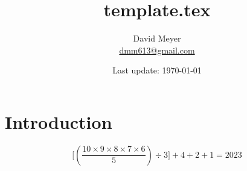 \documentclass{article}
\title{template.tex}
\author{David Meyer \\ \href{mailto:dmm613@gmail.com}
                            {dmm613@gmail.com}}
\date{Last update: \today}
\theoremstyle{definition}
\begin{document}
\maketitle
%
%
%
\section{Introduction}
\label{sec:introduction}



\bigskip
{\large
\begin{center}
\begin{equation*}
\Bigg [ \left (\dfrac{10 \times 9 \times 8 \times 7 \times 6}{5} \right ) \div 3 \Bigg ] + 4 + 2 + 1 = 2023
\end{equation*}
\end{center}}

\bigskip
%
%
%
%
%
%
%
%
%
%
%	
%
%
%
%
\end{document}

